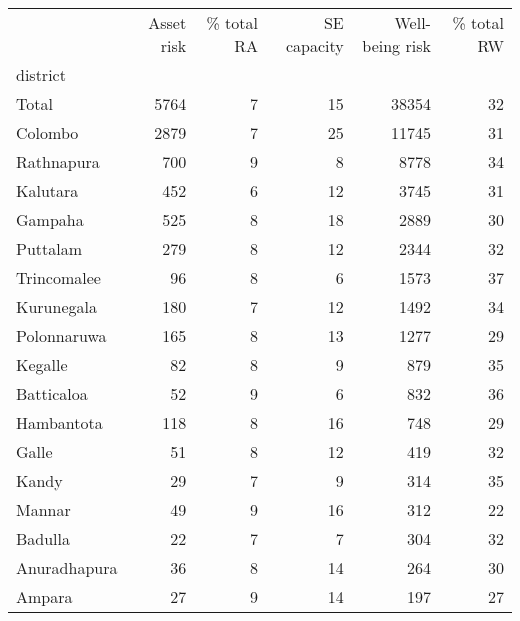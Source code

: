 \begin{tabular}{lrrrrr}
\toprule
{} &  Asset risk &  \% total RA &  SE capacity &  Well-being risk &  \% total RW \\
district     &             &             &              &                  &             \\
\midrule
Total        &        5764 &           7 &           15 &            38354 &          32 \\
Colombo      &        2879 &           7 &           25 &            11745 &          31 \\
Rathnapura   &         700 &           9 &            8 &             8778 &          34 \\
Kalutara     &         452 &           6 &           12 &             3745 &          31 \\
Gampaha      &         525 &           8 &           18 &             2889 &          30 \\
Puttalam     &         279 &           8 &           12 &             2344 &          32 \\
Trincomalee  &          96 &           8 &            6 &             1573 &          37 \\
Kurunegala   &         180 &           7 &           12 &             1492 &          34 \\
Polonnaruwa  &         165 &           8 &           13 &             1277 &          29 \\
Kegalle      &          82 &           8 &            9 &              879 &          35 \\
Batticaloa   &          52 &           9 &            6 &              832 &          36 \\
Hambantota   &         118 &           8 &           16 &              748 &          29 \\
Galle        &          51 &           8 &           12 &              419 &          32 \\
Kandy        &          29 &           7 &            9 &              314 &          35 \\
Mannar       &          49 &           9 &           16 &              312 &          22 \\
Badulla      &          22 &           7 &            7 &              304 &          32 \\
Anuradhapura &          36 &           8 &           14 &              264 &          30 \\
Ampara       &          27 &           9 &           14 &              197 &          27 \\

\end{tabular}
